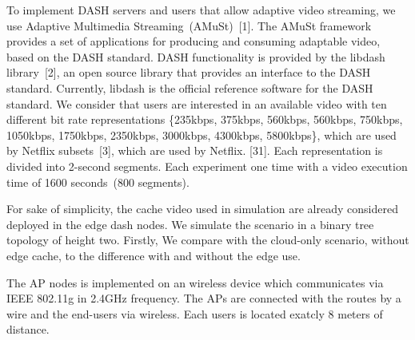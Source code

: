 
To implement DASH servers and users that allow adaptive video streaming, we use Adaptive Multimedia Streaming~(AMuSt)~[1]. The AMuSt framework provides a set of applications for producing and consuming adaptable video, based on the DASH standard. DASH functionality is provided by the libdash library~[2], an open source library that provides an interface to the DASH standard. Currently, libdash is the official reference software for the DASH standard. We consider that users are interested in an available video with ten different bit rate representations \{235kbps, 375kbps, 560kbps, 560kbps, 750kbps, 1050kbps, 1750kbps, 2350kbps, 3000kbps, 4300kbps, 5800kbps\}, which are used by Netflix subsets~[3], which are used by Netflix. [31]. Each representation is divided into 2-second segments. Each experiment one time with a video execution time of 1600 seconds~(800 segments). %


For sake of simplicity, the cache video used in simulation are already considered deployed in the edge dash nodes.
We simulate the scenario in a binary tree topology of height two. Firstly, We compare with the cloud-only scenario, without edge cache, to the difference with and without the edge use.

The AP nodes is implemented on an wireless device which communicates via IEEE 802.11g in 2.4GHz frequency. The APs are connected with the routes by a wire and the end-users via wireless. Each users is located exatcly 8 meters of distance.

